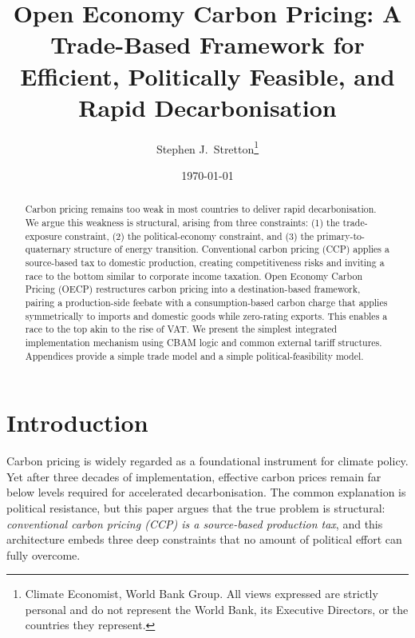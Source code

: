 \documentclass[12pt]{article}
\title{\Large\bfseries
Open Economy Carbon Pricing:
A Trade-Based Framework for Efficient, Politically Feasible,
and Rapid Decarbonisation}
\author{
    Stephen J.\ Stretton\thanks{Climate Economist, World Bank Group.  
    All views expressed are strictly personal and do not represent the World Bank, 
    its Executive Directors, or the countries they represent.}
}
\date{\today}
\begin{document}
\maketitle
\thispagestyle{empty}

\begin{abstract}
Carbon pricing remains too weak in most countries to deliver rapid decarbonisation. We argue this weakness is structural, arising from three constraints: (1) the trade-exposure constraint, (2) the political-economy constraint, and (3) the primary-to-quaternary structure of energy transition. Conventional carbon pricing (CCP) applies a source-based tax to domestic production, creating competitiveness risks and inviting a race to the bottom similar to corporate income taxation. Open Economy Carbon Pricing (OECP) restructures carbon pricing into a destination-based framework, pairing a production-side feebate with a consumption-based carbon charge that applies symmetrically to imports and domestic goods while zero-rating exports. This enables a race to the top akin to the rise of VAT. We present the simplest integrated implementation mechanism using CBAM logic and common external tariff structures. Appendices provide a simple trade model and a simple political-feasibility model.
\end{abstract}

\newpage

\tableofcontents

\newpage
\section{Introduction}

Carbon pricing is widely regarded as a foundational instrument for climate policy. 
Yet after three decades of implementation, effective carbon prices remain far below 
levels required for accelerated decarbonisation. The common explanation is political 
resistance, but this paper argues that the true problem is structural: 
\textit{conventional carbon pricing (CCP) is a source-based production tax}, 
and this architecture embeds three deep constraints that no amount of political 
effort can fully overcome.
\end{document}
